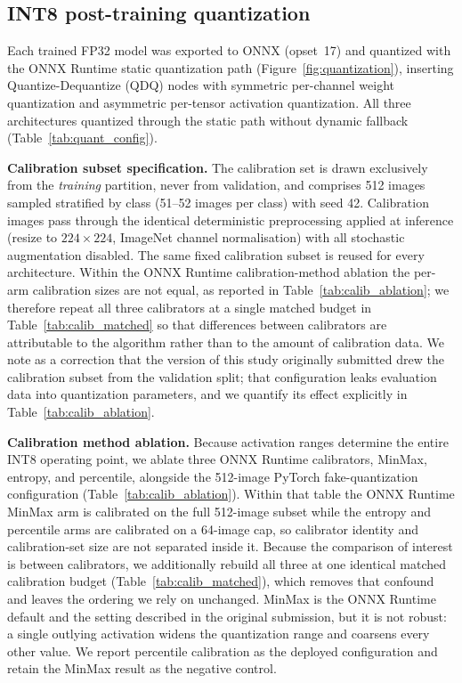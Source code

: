 \documentclass[fleqn,10pt]{wlscirep}
\begin{document}
\subsection*{INT8 post-training quantization}

Each trained FP32 model was exported to ONNX (opset~17) and quantized with the ONNX Runtime static quantization path (Figure~\ref{fig:quantization}), inserting Quantize-Dequantize (QDQ) nodes with symmetric per-channel weight quantization and asymmetric per-tensor activation quantization. All three architectures quantized through the static path without dynamic fallback (Table~\ref{tab:quant_config}).

\textbf{Calibration subset specification.} The calibration set is drawn exclusively from the \emph{training} partition, never from validation, and comprises 512 images sampled stratified by class (51--52 images per class) with seed 42. Calibration images pass through the identical deterministic preprocessing applied at inference (resize to $224 \times 224$, ImageNet channel normalisation) with all stochastic augmentation disabled. The same fixed calibration subset is reused for every architecture. Within the ONNX Runtime calibration-method ablation the per-arm calibration sizes are not equal, as reported in Table~\ref{tab:calib_ablation}; we therefore repeat all three calibrators at a single matched budget in Table~\ref{tab:calib_matched} so that differences between calibrators are attributable to the algorithm rather than to the amount of calibration data. We note as a correction that the version of this study originally submitted drew the calibration subset from the validation split; that configuration leaks evaluation data into quantization parameters, and we quantify its effect explicitly in Table~\ref{tab:calib_ablation}.

\textbf{Calibration method ablation.} Because activation ranges determine the entire INT8 operating point, we ablate three ONNX Runtime calibrators, MinMax, entropy, and percentile, alongside the 512-image PyTorch fake-quantization configuration (Table~\ref{tab:calib_ablation}). Within that table the ONNX Runtime MinMax arm is calibrated on the full 512-image subset while the entropy and percentile arms are calibrated on a 64-image cap, so calibrator identity and calibration-set size are not separated inside it. Because the comparison of interest is between calibrators, we additionally rebuild all three at one identical matched calibration budget (Table~\ref{tab:calib_matched}), which removes that confound and leaves the ordering we rely on unchanged. MinMax is the ONNX Runtime default and the setting described in the original submission, but it is not robust: a single outlying activation widens the quantization range and coarsens every other value. We report percentile calibration as the deployed configuration and retain the MinMax result as the negative control.
\end{document}
